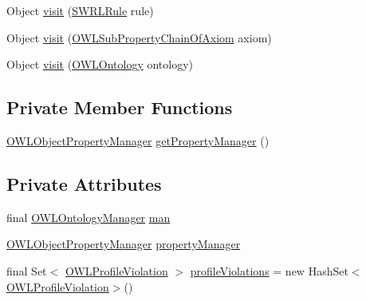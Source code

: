\begin{DoxyCompactItemize}
\item 
Object \hyperlink{classorg_1_1semanticweb_1_1owlapi_1_1profiles_1_1_o_w_l2_e_l_profile_1_1_o_w_l2_e_l_profile_object_visitor_a43360a436899c78502ea4c1f0a2f8c73}{visit} (\hyperlink{interfaceorg_1_1semanticweb_1_1owlapi_1_1model_1_1_s_w_r_l_rule}{S\-W\-R\-L\-Rule} rule)
\item 
Object \hyperlink{classorg_1_1semanticweb_1_1owlapi_1_1profiles_1_1_o_w_l2_e_l_profile_1_1_o_w_l2_e_l_profile_object_visitor_a5dc02fe0831823d941ca5a4c4dc7c71e}{visit} (\hyperlink{interfaceorg_1_1semanticweb_1_1owlapi_1_1model_1_1_o_w_l_sub_property_chain_of_axiom}{O\-W\-L\-Sub\-Property\-Chain\-Of\-Axiom} axiom)
\item 
Object \hyperlink{classorg_1_1semanticweb_1_1owlapi_1_1profiles_1_1_o_w_l2_e_l_profile_1_1_o_w_l2_e_l_profile_object_visitor_a4ca163dc7086deeb357ffe690d6d5f92}{visit} (\hyperlink{interfaceorg_1_1semanticweb_1_1owlapi_1_1model_1_1_o_w_l_ontology}{O\-W\-L\-Ontology} ontology)
\end{DoxyCompactItemize}
\subsection*{Private Member Functions}
\begin{DoxyCompactItemize}
\item 
\hyperlink{classorg_1_1semanticweb_1_1owlapi_1_1util_1_1_o_w_l_object_property_manager}{O\-W\-L\-Object\-Property\-Manager} \hyperlink{classorg_1_1semanticweb_1_1owlapi_1_1profiles_1_1_o_w_l2_e_l_profile_1_1_o_w_l2_e_l_profile_object_visitor_abc3166790132c7aae55588128bcaf5d9}{get\-Property\-Manager} ()
\end{DoxyCompactItemize}
\subsection*{Private Attributes}
\begin{DoxyCompactItemize}
\item 
final \hyperlink{interfaceorg_1_1semanticweb_1_1owlapi_1_1model_1_1_o_w_l_ontology_manager}{O\-W\-L\-Ontology\-Manager} \hyperlink{classorg_1_1semanticweb_1_1owlapi_1_1profiles_1_1_o_w_l2_e_l_profile_1_1_o_w_l2_e_l_profile_object_visitor_a455b8771bc6f9a450800ff12129fbc3a}{man}
\item 
\hyperlink{classorg_1_1semanticweb_1_1owlapi_1_1util_1_1_o_w_l_object_property_manager}{O\-W\-L\-Object\-Property\-Manager} \hyperlink{classorg_1_1semanticweb_1_1owlapi_1_1profiles_1_1_o_w_l2_e_l_profile_1_1_o_w_l2_e_l_profile_object_visitor_aa78b39c33b8ed035cbe7d4688cb1c07b}{property\-Manager}
\item 
final Set$<$ \hyperlink{classorg_1_1semanticweb_1_1owlapi_1_1profiles_1_1_o_w_l_profile_violation}{O\-W\-L\-Profile\-Violation} $>$ \hyperlink{classorg_1_1semanticweb_1_1owlapi_1_1profiles_1_1_o_w_l2_e_l_profile_1_1_o_w_l2_e_l_profile_object_visitor_aab08c4eed769bda24446dd5d008b4a2b}{profile\-Violations} = new Hash\-Set$<$\hyperlink{classorg_1_1semanticweb_1_1owlapi_1_1profiles_1_1_o_w_l_profile_violation}{O\-W\-L\-Profile\-Violation}$>$()
\end{DoxyCompactItemize}


